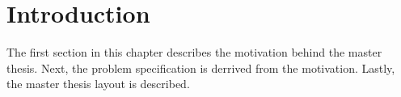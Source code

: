 
\chapter{Introduction}
\label{ch:introduction}
The first section in this chapter describes the motivation behind the master thesis.
Next, the problem specification is derrived from the motivation.
Lastly, the master thesis layout is described.





\cleardoublepage
